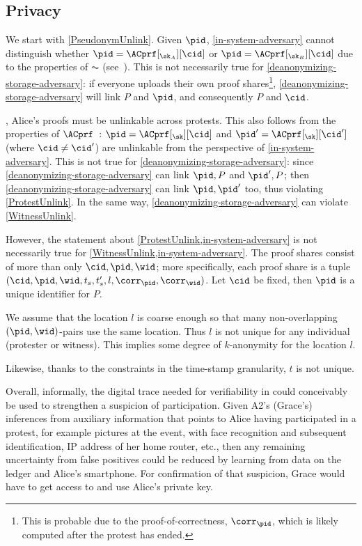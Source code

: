 \subsection{Privacy}

We start with \cref{PseudonymUnlink}.
Given \(\pid\), \cref{in-system-adversary} cannot distinguish whether \(\pid = 
  \ACprf[_{\sk_A}][\cid]\) or \(\pid = \ACprf[_{\sk_B}][\cid]\) due to the 
properties of \(\AC\) (see~\cite{HowToWinTheCloneWars}).
This is not necessarily true for \cref{deanonymizing-storage-adversary}:
if everyone uploads their own proof shares\footnote{%
  This is probable due to the proof-of-correctness, \(\corr_\pid\), which is 
  likely computed after the protest has ended.
}, \cref{deanonymizing-storage-adversary} will link \(P\) and \(\pid\), and 
consequently \(P\) and \(\cid\).

, Alice's proofs must be unlinkable across protests.
This also follows from the properties of 
\(\ACprf\)~\cite{HowToWinTheCloneWars}: \(\pid =  \ACprf[_{\sk}][\cid]\) and 
\(\pid' = \ACprf[_{\sk}][\cid']\) (where \(\cid \neq \cid'\)) are unlinkable 
from the perspective of \cref{in-system-adversary}.
This is not true for \cref{deanonymizing-storage-adversary}: since 
\cref{deanonymizing-storage-adversary} can link \(\pid, P\) and \(\pid', P\); 
then \cref{deanonymizing-storage-adversary} can link \(\pid, \pid'\) too, thus 
violating \cref{ProtestUnlink}.
In the same way, \cref{deanonymizing-storage-adversary} can violate 
\cref{WitnessUnlink}.

However, the statement about \cref{ProtestUnlink,in-system-adversary} is not 
necessarily true for \cref{WitnessUnlink,in-system-adversary}.
The proof shares consist of more than only \(\cid, \pid, \wid\); more 
specifically, each proof share is a tuple \((\cid, \pid, \wid, t_s, t_s', l, 
  \corr_\pid, \corr_\wid)\).
Let \(\cid\) be fixed, then \(\pid\) is a unique identifier for \(P\).

We assume that the location \(l\) is coarse enough so that many non-overlapping 
\((\pid, \wid)\)-pairs use the same location.
Thus \(l\) is not unique for any individual (protester or witness).
This implies some degree of \(k\)-anonymity for the location \(l\).

Likewise, thanks to the constraints in the time-stamp granularity,
\(t\) is not unique.

Overall, informally, the digital trace needed for verifiability in \CROCUS could
conceivably be used to strengthen a suspicion of
participation. Given A2's (Grace's) inferences from auxiliary information that points
to Alice having participated in a protest, for example pictures at the
event, with face recognition and subsequent identification, IP address
of her home router, etc., then any remaining uncertainty from false
positives could be reduced by learning from data on the ledger and
Alice's smartphone. %
For confirmation of that suspicion, Grace would have to get access to
and use Alice's private key.